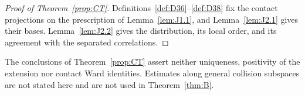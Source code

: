 \begin{proof}[Proof of Theorem~\ref{prop:CT}]
Definitions~\ref{def:D36}--\ref{def:D38} fix the contact projections on the prescription of Lemma~\ref{lem:J1.1}, and Lemma~\ref{lem:J2.1} gives their bases. Lemma~\ref{lem:J2.2} gives the distribution, its local order, and its agreement with the separated correlations.
\end{proof}

The conclusions of Theorem~\ref{prop:CT} assert neither uniqueness, positivity of the extension nor contact Ward identities. Estimates along general collision subspaces are not stated here and are not used in Theorem~\ref{thm:B}.
